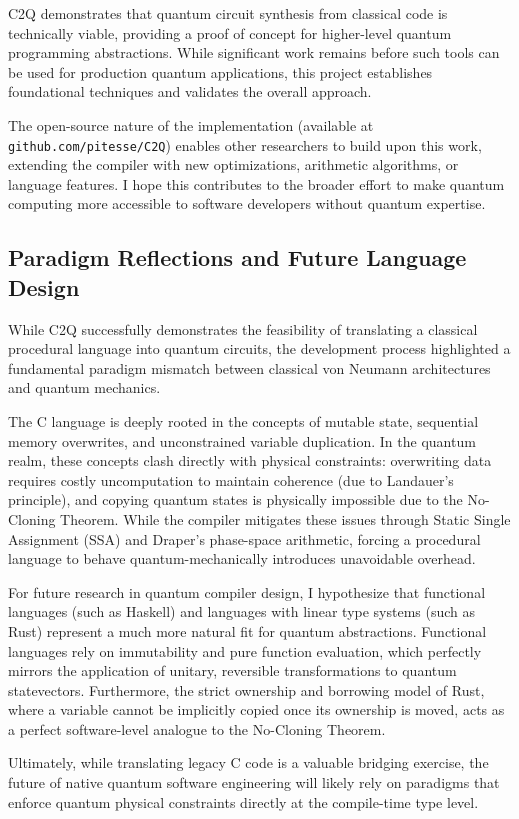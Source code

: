 \documentclass[a4paper,twocolumn]{article}
\begin{document}
C2Q demonstrates that quantum circuit synthesis from classical code is technically viable,
providing a proof of concept for higher-level quantum programming abstractions. While significant work
remains before such tools can be used for production quantum applications, this project establishes
foundational techniques and validates the overall approach.

The open-source nature of the implementation (available at \texttt{github.com/pitesse/C2Q})
enables other researchers to build upon this work, extending the compiler with new optimizations,
arithmetic algorithms, or language features. I hope this contributes to the broader effort to make
quantum computing more accessible to software developers without quantum expertise.


\subsection{Paradigm Reflections and Future Language Design}

While C2Q successfully demonstrates the feasibility of translating a classical procedural language into quantum circuits,
the development process highlighted a fundamental paradigm mismatch between classical von Neumann architectures and quantum mechanics.

The C language is deeply rooted in the concepts of mutable state, sequential memory overwrites, and unconstrained variable duplication.
In the quantum realm, these concepts clash directly with physical constraints: overwriting data requires costly uncomputation to maintain
coherence (due to Landauer's principle), and copying quantum states is physically impossible due to the No-Cloning Theorem. While the compiler
mitigates these issues through Static Single Assignment (SSA) and Draper's phase-space arithmetic, forcing a procedural language to behave
quantum-mechanically introduces unavoidable overhead.

For future research in quantum compiler design, I hypothesize that functional languages (such as Haskell) and languages with
linear type systems (such as Rust) represent a much more natural fit for quantum abstractions.
Functional languages rely on immutability and pure function evaluation, which perfectly mirrors the application of unitary, reversible
transformations to quantum statevectors. Furthermore, the strict ownership and borrowing model of Rust, where a variable cannot be implicitly
copied once its ownership is moved, acts as a perfect software-level analogue to the No-Cloning Theorem.

Ultimately, while translating legacy C code is a valuable bridging exercise, the future of native quantum software engineering will likely
rely on paradigms that enforce quantum physical constraints directly at the compile-time type level.



\end{document}
